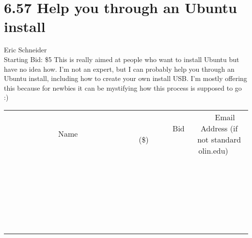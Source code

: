 \documentclass[11pt]{article}
\begin{document}
\section*{6.57 Help you through an Ubuntu install}
Eric Schneider
\\
Starting Bid: \$5
\newline
This is really aimed at people who want to install Ubuntu but have no idea how. I'm not an expert, but I can probably help you through an Ubuntu install, including how to create your own install USB. I'm mostly offering this because for newbies it can be mystifying how this process is supposed to go :)
\\[6ex]
\begin{tabular}{c c c}
~~~~~~~~~~~~~Name~~~~~~~~~~~~~ & ~~~~~~~~~Bid (\$)~~~~~~~~~  & ~~~Email Address (if not standard olin.edu)~~~\\
 & & \\
\hline
 & & \\
\hline
 & & \\
\hline
 & & \\
\hline
 & & \\
\hline
 & & \\
\hline
 & & \\
\hline
 & & \\
\hline
 & & \\
\hline
 & & \\
\hline
 & & \\
\hline
 & & \\
\hline
 & & \\
\hline
 & & \\
\hline
 & & \\
\hline
 & & \\
\hline
 & & \\
\hline
 & & \\
\hline
 & & \\
\hline
 & & \\
\hline
 & & \\
\hline
 & & \\
\hline
 & & \\
\hline
 & & \\
\hline
 & & \\
\hline
 & & \\
\hline
\end{tabular}
\newpage
\end{document}
